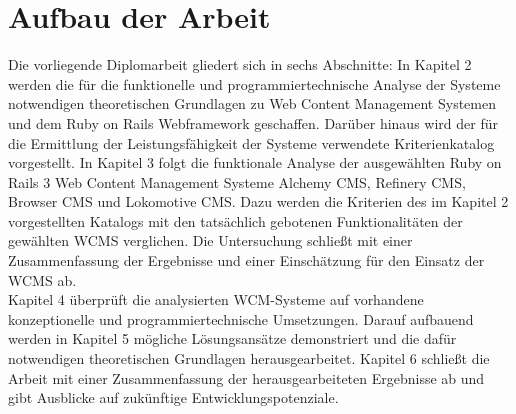 \section{Aufbau der Arbeit}
Die vorliegende Diplomarbeit gliedert sich in sechs Abschnitte:
\newline
\newline
In Kapitel 2 werden die für die funktionelle und programmiertechnische Analyse der Systeme notwendigen theoretischen Grundlagen zu Web Content Management Systemen und dem Ruby on Rails Webframework geschaffen.
Darüber hinaus wird der für die Ermittlung der Leistungsfähigkeit der Systeme verwendete Kriterienkatalog vorgestellt.
\newline
\newline
In Kapitel 3 folgt die funktionale Analyse der ausgewählten Ruby on Rails 3 Web Content Management Systeme Alchemy CMS, Refinery CMS, Browser CMS und Lokomotive CMS. Dazu werden die Kriterien des im Kapitel 2 vorgestellten Katalogs mit den tatsächlich gebotenen Funktionalitäten der gewählten WCMS verglichen. Die Untersuchung schließt mit einer Zusammenfassung der Ergebnisse und einer Einschätzung für den Einsatz der WCMS ab.\\
\newline
Kapitel 4 überprüft die analysierten WCM-Systeme auf vorhandene konzeptionelle und programmiertechnische Umsetzungen.
Darauf aufbauend werden in Kapitel 5 mögliche Lösungsansätze demonstriert und die dafür notwendigen theoretischen Grundlagen herausgearbeitet.
Kapitel 6 schließt die Arbeit mit einer Zusammenfassung der herausgearbeiteten Ergebnisse ab und gibt Ausblicke auf zukünftige Entwicklungspotenziale.
%
%

